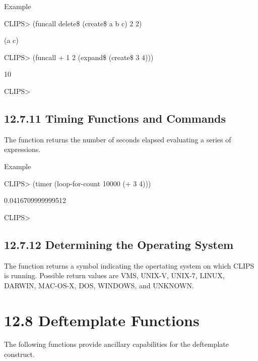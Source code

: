 \documentclass[letterpaper,10pt,english]{sphinxmanual}
\begin{document}
Example

CLIPS\textgreater{} (funcall delete\$ (create\$ a b c) 2 2)

(a c)

CLIPS\textgreater{} (funcall + 1 2 (expand\$ (create\$ 3 4)))

10

CLIPS\textgreater{}


\subsection{12.7.11 Timing Functions and Commands}
\label{\detokenize{actions:timing-functions-and-commands}}
The function  returns the number of seconds elapsed evaluating
a series of expressions.


\begin{sphinxVerbatim}[commandchars=\\\{\}]
 
\end{sphinxVerbatim}

Example

CLIPS\textgreater{} (timer (loop-for-count 10000 (+ 3 4)))

0.0416709999999512

CLIPS\textgreater{}


\subsection{12.7.12 Determining the Operating System}
\label{\detokenize{actions:determining-the-operating-system}}
The  function returns a symbol indicating the
opertating system on which CLIPS is running. Possible return values are
VMS, UNIX-V, UNIX-7, LINUX, DARWIN, MAC-OS-X, DOS, WINDOWS, and UNKNOWN.


\begin{sphinxVerbatim}[commandchars=\\\{\}]
\end{sphinxVerbatim}


\section{12.8 Deftemplate Functions}
\label{\detokenize{actions:deftemplate-functions}}
The following functions provide ancillary capabilities for the
deftemplate construct.
\end{document}
